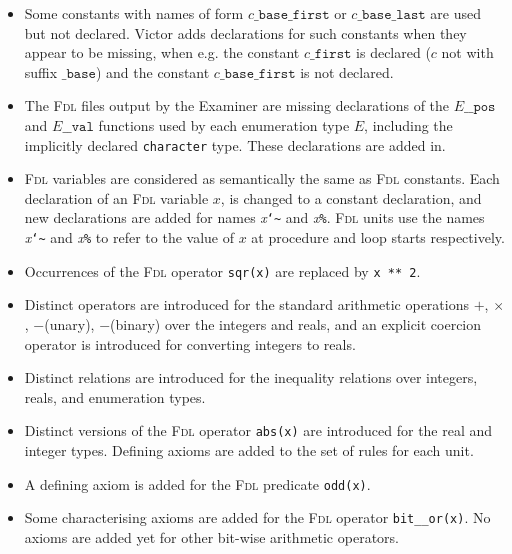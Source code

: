 \documentclass[12pt,fleqn]{article}
\newcommand{\fdl}{\textsc{Fdl}}
\newcommand{\tttilde}{{\tt \char`\~}}
\begin{document}
\begin{itemize}

\item Some constants with names of form 
   $\mathit{c}\mathtt{\_base\_first}$
   or $\mathit{c}\mathtt{\_base\_last}$
   are used but not declared.  Victor adds declarations for such constants
   when they appear to be missing, when e.g. the constant
   $\mathit{c}\mathtt{\_first}$ is declared ($c$ not with suffix $\mathtt{\_base}$) and the constant 
   $\mathit{c}\mathtt{\_base\_first}$ is not declared.

\item The \fdl{} files output by the Examiner are missing declarations
  of the $\mathit{E}\_\_\mathtt{pos}$
  and $\mathit{E}\_\_\mathtt{val}$ functions used by each enumeration type
  $E$, including the implicitly declared \texttt{character} type.  These
  declarations are added in.

\item \fdl{} variables are considered as semantically the same as
  \fdl{} constants.  Each declaration of an \fdl{} variable $x$, is
  changed to a constant declaration, and new declarations are added
  for names \textit{x}\tttilde{} and \textit{x}\texttt{\%}.  \fdl{}
  units use the names \textit{x}\tttilde{} and \textit{x}\texttt{\%}
  to refer to the value of $x$ at procedure and loop starts
  respectively.


\item Occurrences of the \fdl{} operator \texttt{sqr(x)} are replaced by 
  \texttt{x ** 2}.

\item Distinct operators are introduced for the standard arithmetic operations
  $+$, $\times$, $-$(unary), $-$(binary) over the integers and reals,
  and an explicit coercion operator is introduced for converting integers
  to reals.

\item Distinct relations are introduced for the inequality relations 
  over integers, reals, and enumeration types. 

\item Distinct versions of the \fdl{} operator \texttt{abs(x)} are introduced
  for the real and integer types.   Defining axioms are added to the set
  of rules for each unit.

\item A defining axiom is added for the \fdl{} predicate \texttt{odd(x)}.

\item Some characterising axioms are added for the \fdl{} operator
   \texttt{bit\_\_or(x)}.  No axioms are added yet for other bit-wise
   arithmetic operators.


\end{itemize}
\end{document}

